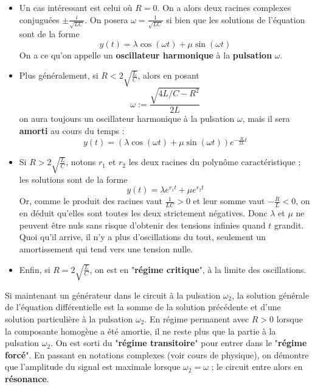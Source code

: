 \documentclass[french]{book}
\theoremstyle{plain}
\theoremstyle{definition}
\theoremstyle{remark}
\begin{document}
\begin{itemize}
	\item Un cas intéressant est celui où $R = 0$. On a alors deux racines complexes conjuguées $\displaystyle\pm \frac{i}{\sqrt{LC}}$. On posera $\displaystyle\omega = \frac{1}{\sqrt{LC}}$ si bien que les solutions de l'équation sont de la forme $$y(t) = \lambda \cos(\omega t) + \mu \sin(\omega t)$$
	On a ce qu'on appelle un \textbf{oscillateur harmonique} à la \textbf{pulsation} $\omega$.
	\item Plus généralement, si $\displaystyle R < 2\sqrt{\frac{L}{C}}$, alors en posant $$\omega := \frac{\sqrt{4L/C-R^2}}{2L}$$ on aura toujours un oscillateur harmonique à la pulsation $\omega$, mais il sera \textbf{amorti} au cours du temps : $$y(t) = (\lambda \cos(\omega t) + \mu \sin(\omega t))e^{-\frac{R}{2L}t}$$
	\item Si $\displaystyle R > 2\sqrt{\frac{L}{C}}$, notons $r_1$ et $r_2$ les deux racines du polynôme caractéristique ; les solutions sont de la forme $$y(t) = \lambda e^{r_1 t} + \mu e^{r_2 t}$$ Or, comme le produit des racines vaut $\displaystyle \frac{1}{LC} > 0$ et leur somme vaut $\displaystyle -\frac{R}{L} < 0$, on en déduit qu'elles sont toutes les deux strictement négatives. Donc $\lambda$ et $\mu$ ne peuvent être nuls sans risque d'obtenir des tensions infinies quand $t$ grandit. Quoi qu'il arrive, il n'y a plus d'oscillations du tout, seulement un amortissement qui tend vers une tension nulle.
	\item Enfin, si $R=\displaystyle2\sqrt{\frac{L}{C}}$, on est en "\textbf{régime critique}", à la limite des oscillations.
\end{itemize}
Si maintenant un générateur dans le circuit à la pulsation $\omega_2$, la solution générale de l'équation différentielle est la somme de la solution précédente et d'une solution particulière à la pulsation $\omega_2$. En régime permanent avec $R>0$ lorsque la composante homogène a été amortie, il ne reste plus que la partie à la pulsation $\omega_2$. On est sorti du "\textbf{régime transitoire}" pour entrer dans le "\textbf{régime forcé}". En passant en notations complexes (voir cours de physique), on démontre que l'amplitude du signal est maximale lorsque $\omega_2=\omega$ ; le circuit entre alors en \textbf{résonance}.
\end{document}
